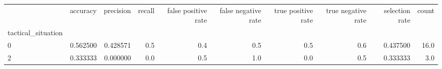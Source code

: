 \begin{tabular}{lrrrrrrrrr}
\toprule
{} &  accuracy &  precision &  recall &  false positive rate &  false negative rate &  true positive rate &  true negative rate &  selection rate &  count \\
tactical\_situation &           &            &         &                      &                      &                     &                     &                 &        \\
\midrule
0                  &  0.562500 &   0.428571 &     0.5 &                  0.4 &                  0.5 &                 0.5 &                 0.6 &        0.437500 &   16.0 \\
2                  &  0.333333 &   0.000000 &     0.0 &                  0.5 &                  1.0 &                 0.0 &                 0.5 &        0.333333 &    3.0 \\
\bottomrule
\end{tabular}
